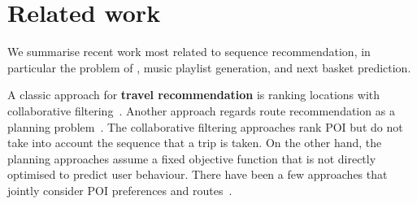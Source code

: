 




\section{Related work}
\label{sec:related}


We summarise recent work most related to sequence recommendation, 
in particular the problem of \trajrec, music playlist generation, 
and next basket prediction.


A classic approach for {\bf travel recommendation} is ranking locations with collaborative filtering~\cite{shi2011personalized,zhang2015location,ijcai13}.
Another approach regards route recommendation as a planning problem~\cite{brilhante2013shall,gioniswsdm14,ijcai15}.
The collaborative filtering approaches rank POI but do not take into account the sequence that a trip is taken. 
On the other hand, the planning approaches assume a fixed objective function that is not directly optimised to predict user behaviour. 
There have been a few approaches that jointly consider POI preferences and routes~\cite{chen2015tripplanner,kurashima2010geotag,kurashima2010geotag,cikm16paper}.

